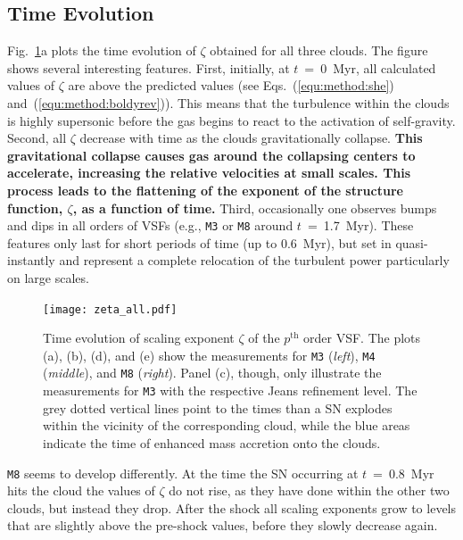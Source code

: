 \subsection{Time Evolution}
Fig.~\ref{pic:results:zeta_all}a plots the time evolution of $\zeta$ obtained for all three clouds.
The figure shows several interesting features.
First, initially, at $t$~=~0~Myr, all calculated values of $\zeta$ are above the predicted values (see Eqs.~(\ref{equ:method:she}) and~(\ref{equ:method:boldyrev})).
This means that the turbulence within the clouds is highly supersonic before the gas begins to react to the activation of self-gravity.
Second, all $\zeta$ decrease with time as the clouds gravitationally collapse.
\textbf{This gravitational collapse causes gas around the collapsing centers to accelerate, increasing the relative velocities at small scales. This process leads to the flattening of the exponent of the structure function, $\zeta$, as a function of time. }
Third, occasionally one observes bumps and dips in all orders of VSFs (e.g., \texttt{M3} or \texttt{M8} around $t$~=~1.7~Myr). 
These features only last for short periods of time (up to 0.6~Myr), but set in quasi-instantly and represent a complete relocation of the turbulent power particularly on large scales. 

\begin{figure}[!htb]
	\centering
	\texttt{[image: zeta\_all.pdf]}
	\caption{ Time evolution of scaling exponent $\zeta$ of the $p^\mathrm{th}$ order VSF. The plots (a), (b), (d), and (e) show the measurements for \texttt{M3} (\textit{left}), \texttt{M4} (\textit{middle}), and \texttt{M8} (\textit{right}). Panel (c), though, only illustrate the measurements for \texttt{M3} with the respective Jeans refinement level. The grey dotted vertical lines point to the times than a SN explodes within the vicinity of the corresponding cloud, while the blue areas indicate the time of enhanced mass accretion onto the clouds.
	}
	\label{pic:results:zeta_all}
\end{figure}

\texttt{M8} seems to develop differently.
At the time the SN occurring at $t$~=~0.8~Myr hits the cloud the values of $\zeta$ do not rise, as they have done within the other two clouds, but instead they drop. 
After the shock all scaling exponents grow to levels that are slightly above the pre-shock values, before they slowly decrease again.

